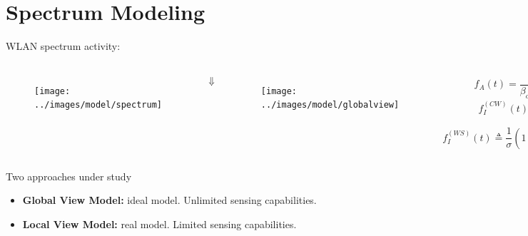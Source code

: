\documentclass[9pt,handout,serif]{beamer}
\begin{document}
\section{Spectrum Modeling}
\begin{frame}[c]
	WLAN spectrum activity:
	\begin{columns}
		\begin{figure}
			\texttt{[image: ../images/model/spectrum]}
		\end{figure}
		\begin{center}
			$\Downarrow$
		\end{center}
		\begin{figure}
			\texttt{[image: ../images/model/globalview]}
		\end{figure}
		
		\begin{equation}
			\label{eq:Active}
			f_A(t) = \frac{1}{\beta_{on} - \alpha_{on}}
		\end{equation}
			\begin{equation}
				\label{eq:Idle}
				f^{(CW)}_I(t) = \frac{1}{\alpha_{bk}}
			\end{equation}
			\begin{equation}
				\label{eq:Idle}
				f^{(WS)}_I(t) \triangleq \frac{1}{\sigma}(1+\xi\frac{t}{\sigma})^{(-\frac{1}{\xi}-1)}
			\end{equation}
		\begin{center}
			$\Downarrow$
		\end{center}
		\begin{equation}
			\label{eq:Idle}
			f_I(t) \triangleq p \, f^{(CW)}_I(t) + (1 - p) \, f^{(WS)}_I
		\end{equation}
	\end{columns}
	
	Two approaches under study
	\begin{itemize}
		\item \textbf{Global View Model:} ideal model. Unlimited sensing capabilities.
		\item \textbf{Local View Model:} real model. Limited sensing capabilities.
	\end{itemize}
\end{frame}
\end{document}
